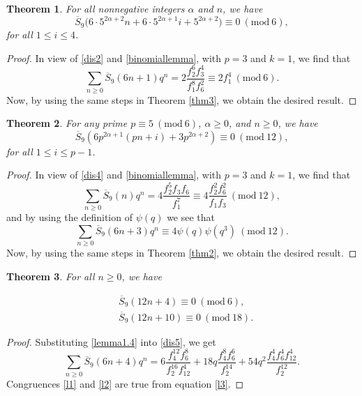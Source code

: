 \documentclass[12pt]{amsart}
\theoremstyle{plain}
\newtheorem{theorem}{Theorem}[section]
\theoremstyle{definition}
\begin{document}
\begin{theorem} \label{thm8}  For all nonnegative integers $\alpha$ and  $n$, we have
\begin{equation*}
\overline{S}_{9} \bigl(6 \cdot 5^{2\alpha+2}n + 6 \cdot 5^{2\alpha+1}i + 5^{2\alpha+2}  \bigl) \equiv 0 \ (\mathrm{mod} \ 6), 
\end{equation*}
for all $1\leq i \leq 4$.
\end{theorem}




\begin{proof} In view of \eqref{dis2} and \eqref{binomiallemma}, with $p=3$ and $k=1$, we find that
\[
\sum_{n \geq 0} \overline{S}_{9}(6n+1) q^{n}= 2\dfrac{f_{2}^{6} f_{3}^{4}}{f_{1}^{8} f_{6}^{2}} \equiv 2f_{1}^{4} \ (\mathrm{mod} \ 6).
\]
Now, by using the same steps in Theorem \ref{thm3}, we obtain the desired result.
\end{proof}



\begin{theorem} \label{thm9} For any prime $p\equiv 5 \ (\mathrm{mod} \ 6)$, $\alpha \geq 0$, and $n\geq 0$, we have
\[
\overline{S}_{9} \left(6p^{2\alpha+1}(pn+i)+3p^{2\alpha+2}\right)\equiv 0 \ (\mathrm{mod} \ 12),
\]
for all $1\leq i \leq p-1$.
\end{theorem}

\begin{proof} In view of \eqref{dis4} and \eqref{binomiallemma}, with $p=3$ and $k=1$, we find that
\[
\sum_{n \geq 0} \overline{S}_{9}(n) q^{n}= 4\dfrac{f_{2}^{5} f_{3} f_{6}}{f_{1}^{7}} \equiv 4\frac{f_{2}^{2} f_{6}^{2}}{f_{1} f_{3}}  \ (\mathrm{mod} \ 12), 
\]
and by using the definition of $\psi(q)$ we see that
\[
\sum_{n \geq 0} \overline{S}_{9}(6n+3) q^{n} \equiv 4\psi(q) \psi(q^{3}) \ (\mathrm{mod} \ 12).
\]
Now, by using the same steps in Theorem \ref{thm2}, we obtain the desired result.
\end{proof}

\begin{theorem} For all $n\geq 0$, we have

\begin{align}
&\overline{S}_{9}(12n+4)  \equiv 0 \ (\mathrm{mod} \ 6), \label{l1}\\
&\overline{S}_{9}(12n+10) \equiv 0 \ (\mathrm{mod} \ 18). \label{l2}
\end{align}
\end{theorem}

\begin{proof} Substituting \eqref{lemma1.4} into \eqref{dis5}, we get
\begin{equation}
\sum_{n\geq 0} \overline{S}_{9}(6n+4) q^{n}  = 6\dfrac{f_{4}^{12} f_{6}^{8}}{f_{2}^{16} f_{12}^{4}} + 18q \dfrac{f_{4}^{8} f_{6}^{6}}{f_{2}^{14}} +54q^{2} \dfrac{f_{4}^{4} f_{6}^{4} f_{12}^{4}}{f_{2}^{12}}. \label{l3}
\end{equation}
Congruences \eqref{l1} and \eqref{l2} are true from equation \eqref{l3}.
\end{proof}
\end{document}
